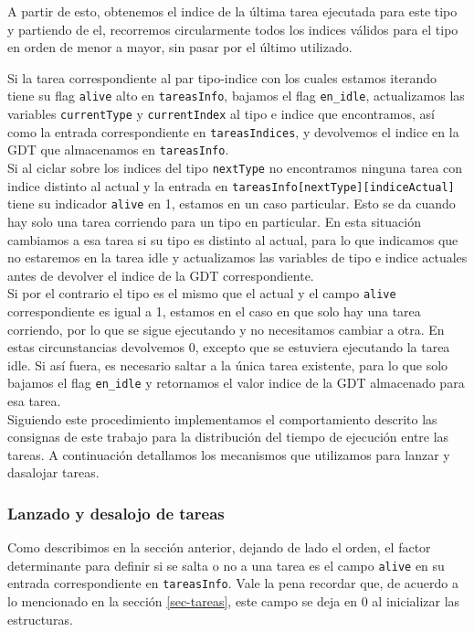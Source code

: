 A partir de esto, obtenemos el indice de la última tarea ejecutada para este tipo y partiendo de el, recorremos circularmente todos los indices válidos para el tipo en orden de menor a mayor, sin pasar por el último utilizado.

Si la tarea correspondiente al par tipo-indice con los cuales estamos iterando tiene su flag \verb|alive| alto en \verb|tareasInfo|, bajamos el flag \verb|en_idle|, actualizamos las variables \verb|currentType| y \verb|currentIndex| al tipo e indice que encontramos, así como la entrada correspondiente en \verb|tareasIndices|, y devolvemos el indice en la GDT que almacenamos en \verb|tareasInfo|.
\\

Si al ciclar sobre los indices del tipo \verb|nextType| no encontramos ninguna tarea con indice distinto al actual y la entrada en \verb|tareasInfo[nextType][indiceActual]| tiene su indicador \verb|alive| en 1, estamos en un caso particular. 
Esto se da cuando hay solo una tarea corriendo para un tipo en particular. 
En esta situación cambiamos a esa tarea si su tipo es distinto al actual, para lo que indicamos que no estaremos en la tarea idle y actualizamos las variables de tipo e indice actuales antes de devolver el indice de la GDT correspondiente. \\
Si por el contrario el tipo es el mismo que el actual y el campo \verb|alive| correspondiente es igual a 1, estamos en el caso en que solo hay una tarea corriendo, por lo que se sigue ejecutando y no necesitamos cambiar a otra. En estas circunstancias devolvemos 0, excepto que se estuviera ejecutando la tarea idle. Si así fuera, es necesario saltar a la única tarea existente, para lo que solo bajamos el flag \verb|en_idle| y retornamos el valor indice de la GDT almacenado para esa tarea.\\

Siguiendo este procedimiento implementamos el comportamiento descrito las consignas de este trabajo para la distribución del tiempo de ejecución entre las tareas. A continuación detallamos los mecanismos que utilizamos para lanzar y dasalojar tareas.


\subsubsection{Lanzado y desalojo de tareas}

Como describimos en la sección anterior, dejando de lado el orden, el factor determinante para definir si se salta o no a una tarea es el campo \verb|alive| en su entrada correspondiente en \verb|tareasInfo|. Vale la pena recordar que, de acuerdo a lo mencionado en la sección \ref{sec-tareas}, este campo se deja en 0 al inicializar las estructuras.

